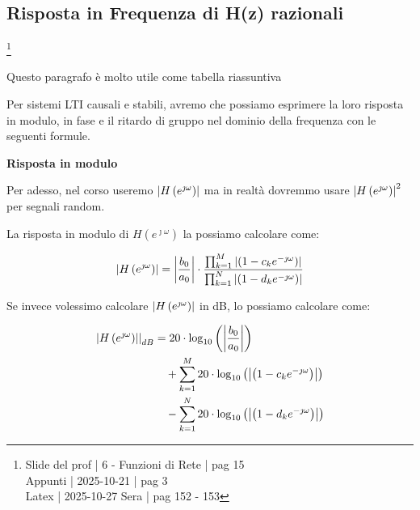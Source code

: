 \subsection{Risposta in Frequenza di H(z) razionali}

\footnote{ 
    Slide del prof | 6 - Funzioni di Rete | pag 15\\
    Appunti | 2025-10-21 | pag 3 \\ 
    Latex | 2025-10-27 Sera | pag 152 - 153
} 

\begin{tcolorbox}
    Questo paragrafo è molto utile come tabella riassuntiva
\end{tcolorbox}

Per sistemi LTI causali e stabili, avremo che possiamo esprimere la loro risposta in modulo, in fase e il ritardo di gruppo nel dominio della frequenza con le seguenti formule. \newline 

\textbf{Risposta in modulo} \newline 

\begin{tcolorbox}
Per adesso, nel corso useremo $\abs{H \left(e^{\jmath \omega}\right)}$ ma in realtà dovremmo usare $\abs{H \left(e^{\jmath \omega}\right)}^{2}$ per segnali random.     
\end{tcolorbox}

La risposta in modulo di $H \left(e^{\jmath \omega}\right)$ la possiamo calcolare come: 

{ 
    \Large 
    \begin{equation}
        \abs{H \left(e^{\jmath \omega}\right)} 
        = 
        \abs{\dfrac{b_0}{a_0}}
        \cdot 
        \dfrac{\prod_{k = 1}^{M} \abs{\left( 1 - c_k e^{-\jmath \omega}\right)}}{\prod_{k = 1}^{N} \abs{\left( 1 - d_k e^{-\jmath \omega}\right)}}
    \end{equation}
}

Se invece volessimo calcolare $\abs{H \left(e^{\jmath \omega}\right)}$ in dB, 
lo possiamo calcolare come: 

{
    \Large 
    \begin{equation}
        \begin{split}
        \left.
        \abs{H \left(e^{\jmath \omega}\right)}
        \right|_{dB}
        &= 
        20 \cdot \log_{10}
        \left( \abs{\dfrac{b_0}{a_0}} \right)
        \\
        &\quad
        +
        \sum_{k = 1}^{M}
        20 \cdot \log_{10}
        \left(  \abs{\left( 1 - c_k e^{-\jmath \omega}\right)} \right)
        \\
        &\quad
        -
        \sum_{k = 1}^{N}
        20 \cdot \log_{10}
        \left(  \abs{\left( 1 - d_k e^{-\jmath \omega}\right)} \right) 
        \end{split}
    \end{equation}
}


